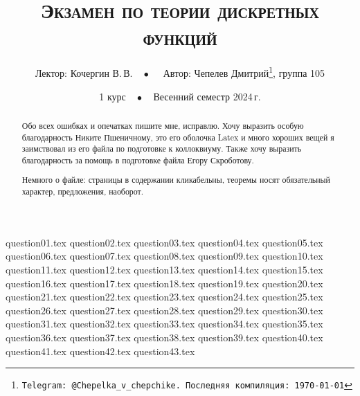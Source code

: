 \documentclass[a4paper, 11pt]{article}
\begin{document}
\title{\bfseries\scshape Экзамен по теории дискретных функций}
\date{1 курс$\quad\bullet\quad$Весенний семестр 2024\,г.}
\author{Лектор: Кочергин В.\,В.$\quad\bullet\quad$ Автор: Чепелев Дмитрий\thanks{\texttt{Telegram: @Chepelka\_v\_chepchike. Последняя компиляция: \today}}, группа 105}

\maketitle

\begin{abstract}
    Обо всех ошибках и опечатках пишите мне, исправлю. Хочу выразить особую благодарность Никите Пшеничному, это его оболочка Latex и много хороших вещей я заимствовал из его файла по подготовке к коллоквиуму. Также хочу выразить благодарность за помощь в подготовке файла Егору Скроботову.

    Немного о файле: страницы в содержании кликабельны, теоремы носят обязательный характер, предложения, наоборот.
\end{abstract}

\tableofcontents

\newpage

{question01.tex}
{question02.tex}
{question03.tex}
{question04.tex}
{question05.tex}
{question06.tex}
{question07.tex}
{question08.tex}
{question09.tex}
{question10.tex}
{question11.tex}
{question12.tex}
{question13.tex}
{question14.tex}
{question15.tex}
{question16.tex}
{question17.tex}
{question18.tex}
{question19.tex}
{question20.tex}
{question21.tex}
{question22.tex}
{question23.tex}
{question24.tex}
{question25.tex}
{question26.tex}
{question27.tex}
{question28.tex}
{question29.tex}
{question30.tex}
{question31.tex}
{question32.tex}
{question33.tex}
{question34.tex}
{question35.tex}
{question36.tex}
{question37.tex}
{question38.tex}
{question39.tex}
{question40.tex}
{question41.tex}
{question42.tex}
{question43.tex}
\end{document}
